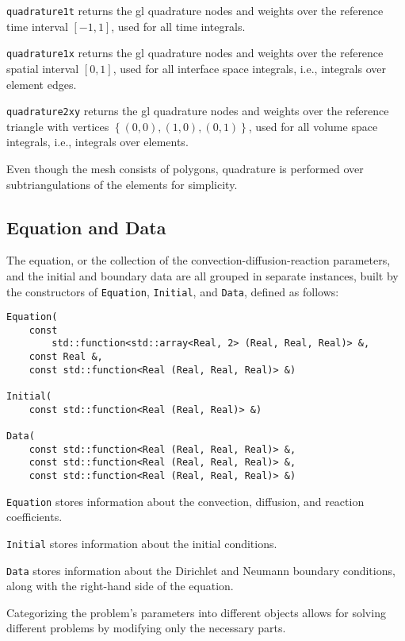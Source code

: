 \lstinline{quadrature1t} returns the \acrshort{gl} quadrature nodes and weights over the reference time interval $\left[ -1, 1 \right]$, used for all time integrals.

\lstinline{quadrature1x} returns the \acrshort{gl} quadrature nodes and weights over the reference spatial interval $\left[ 0, 1 \right]$, used for all interface space integrals, i.e., integrals over element edges.

\lstinline{quadrature2xy} returns the \acrshort{gl} quadrature nodes and weights over the reference triangle with vertices $\left\{ \left( 0, 0 \right), \left( 1, 0 \right), \left( 0, 1 \right) \right\}$, used for all volume space integrals, i.e., integrals over elements.

Even though the mesh consists of polygons, quadrature is performed over subtriangulations of the elements for simplicity.

\newpage
\subsection{Equation and Data}

The equation, or the collection of the convection-diffusion-reaction parameters, and the initial and boundary data are all grouped in separate instances, built by the constructors of \lstinline{Equation}, \lstinline{Initial}, and \lstinline{Data}, defined as follows:
\begin{lstlisting}[style=cpp]
Equation(
    const 
        std::function<std::array<Real, 2> (Real, Real, Real)> &, 
    const Real &, 
    const std::function<Real (Real, Real, Real)> &)

Initial(
    const std::function<Real (Real, Real)> &)

Data(
    const std::function<Real (Real, Real, Real)> &, 
    const std::function<Real (Real, Real, Real)> &, 
    const std::function<Real (Real, Real, Real)> &)
\end{lstlisting}

\lstinline{Equation} stores information about the convection, diffusion, and reaction coefficients.

\lstinline{Initial} stores information about the initial conditions.

\lstinline{Data} stores information about the Dirichlet and Neumann boundary conditions, along with the right-hand side of the equation.

Categorizing the problem's parameters into different objects allows for solving different problems by modifying only the necessary parts.

